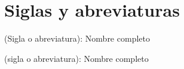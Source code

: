 \thispagestyle{empty}
\chapter*{Siglas y abreviaturas}
{(Sigla o abreviatura): Nombre completo\par}
\vspace{1.5em}
{(sigla o abreviatura): Nombre completo\par}
\thispagestyle{empty}